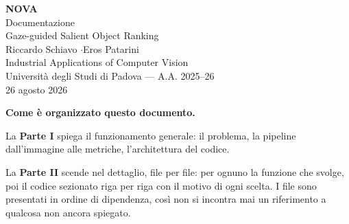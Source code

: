 \documentclass[11pt,a4paper]{article}
\def\oggidata{26 agosto 2026}
\begin{document}
\sffamily

\thispagestyle{empty}
\vspace*{3cm}
\begin{center}
  {\color{novaNavy}\fontsize{40}{44}\selectfont\bfseries NOVA}\\[8pt]
  {\color{novaCyan}\Large Documentazione}\\[12pt]
  {\color{novaGray}\large Gaze-guided Salient Object Ranking}\\[2.2cm]

  {\large\color{novaInk} Riccardo Schiavo \quad$\cdot$\quad Eros Patarini}\\[6pt]
  {\color{novaInk} Industrial Applications of Computer Vision}\\
  {\color{novaInk} Università degli Studi di Padova --- A.A. 2025--26}\\[1.2cm]

  {\color{novaGray}\small \oggidata}
\end{center}

\vfill
\begin{nota}
\textbf{Come è organizzato questo documento.}

\medskip
La \textbf{Parte I} spiega il funzionamento generale: il problema, la pipeline dall'immagine alle
metriche, l'architettura del codice.

\medskip
La \textbf{Parte II} scende nel dettaglio, file per file: per ognuno la funzione che svolge, poi
il codice sezionato riga per riga con il motivo di ogni scelta. I file sono presentati in ordine
di dipendenza, così non si incontra mai un riferimento a qualcosa non ancora spiegato.
\end{nota}
\vspace{0.6cm}

\newpage
\tableofcontents
\newpage




\end{document}
